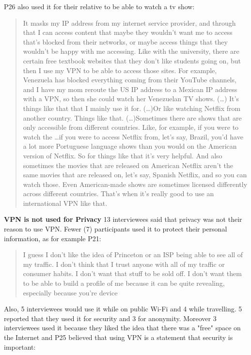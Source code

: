 P26 also used it for their relative to be able to watch a tv show:
\begin{quote}It masks my IP address from my internet service provider, and through that I can access content that maybe they wouldn't want me to access that's blocked from their networks, or maybe access things that they wouldn't be happy with me accessing. Like with the university, there are certain free textbook websites that they don't like students going on, but then I use my VPN to be able to access those sites. For example, Venezuela has blocked everything coming from their YouTube channels, and I have my mom reroute the US IP address to a Mexican IP address with a VPN, so then she could watch her Venezuelan TV shows. (\dots) It's things like that that I mainly use it for.
(\dots)Or like watching Netflix from another country. Things like that. (\dots)Sometimes there are shows that are only accessible from different countries. Like, for example, if you were to watch the \dots if you were to access Netflix from, let's say, Brazil, you'd have a lot more Portuguese language shows than you would on the American version of Netflix. So for things like that it's very helpful. And also sometimes the movies that are released on American Netflix aren't the same movies that are released on, let's say, Spanish Netflix, and so you can watch those. Even American-made shows are sometimes licensed differently across different countries. That's when it's really good to use an international VPN like that.\end{quote}

\textbf{VPN is not used for Privacy} 13 interviewees said that privacy was not their reason to use VPN. Fewer (7) participants used it to protect their personal information, as for example P21:
\begin{quote}I guess I don't like the idea of Princeton or an ISP being able to see all of my traffic. I don't think that I trust anyone with all of my traffic or consumer habits. I don't want that stuff to be sold off. I don't want them to be able to build a profile of me because it can be quite revealing, especially because you're device\end{quote}


Also, 5 interviewees would use it while on public Wi-Fi and 4 while travelling. 5 reported that they used it for security and 3 for anonymity.  Moreover 3 interviewees used it because they liked the idea that there was a "free" space on the Internet and P25 believed that using VPN is a statement that security is important:

